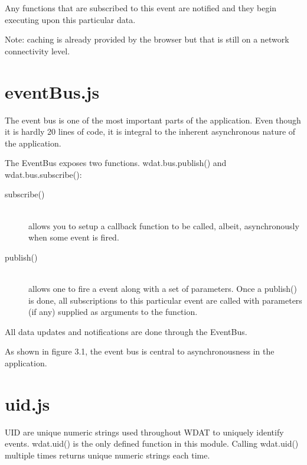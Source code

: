 Any functions that are subscribed to this event are notified and they
begin executing upon this particular data.

Note: caching is already provided by the browser but that is still on
a network connectivity level.

\section{eventBus.js}

The event bus is one of the most important parts of the application.
Even though it is hardly 20 lines of code, it is integral to the
inherent asynchronous nature of the application.

The EventBus exposes two functions.  wdat.bus.publish() and
wdat.bus.subscribe():

\begin{description}
  \item[subscribe()] \hfill \\
  allows you to setup a callback function to be called,
  albeit, asynchronously when some event is fired.

  \item[publish()] \hfill \\
  allows one to fire a event along with a set of parameters.
  Once a publish() is done, all subscriptions to this particular event
  are called with parameters (if any) supplied as arguments to the
  function. 
\end{description}

All data updates and notifications are done through the EventBus.


As shown in figure 3.1, the event bus is central to asynchronousness in
the application.

\section{uid.js}

UID are unique numeric strings used throughout WDAT to uniquely
identify events.  wdat.uid() is the only defined function in this
module.  Calling wdat.uid() multiple times returns unique numeric
strings each time.

